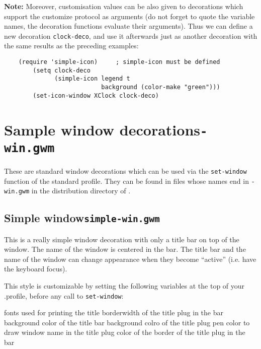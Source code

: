 {\bf Note:} Moreover, customisation values can be also given to decorations
which support the customize protocol as arguments (do not forget to quote the
variable names, the decoration functions evaluate their arguments). Thus we
can define a new decoration \verb"clock-deco", and use it afterwards just as
another decoration with the same results as the preceding examples:

{\exemplefont\begin{verbatim}
	(require 'simple-icon)     ; simple-icon must be defined
        (setq clock-deco 
              (simple-icon legend t 
                           background (color-make "green")))
        (set-icon-window XClock clock-deco)		    
\end{verbatim}}


\section{Sample window decorations\hfill{\tt *-win.gwm}}
\label{standard-decorations}

These are standard window decorations which can be used via the
\verb"set-window" function of the standard profile. They can be found in
files whose names end in {\tt -win.gwm} in the distribution directory of
{\GWM}.

\subsection{Simple window\hfill{\tt simple-win.gwm}}
\label{simple-win}

\centerline{}

This is a really simple window decoration with only a title bar on top of
the window. The name of the window is centered in the bar. The title bar and
the name of the window can change appearance when they become ``active'' (i.e.
have the keyboard focus).

This style is customizable by setting the following variables at the top
of your .profile, before any call to \verb"set-window":

\begin{description}
fonts used for printing the title
borderwidth of the title plug in the bar
background color of the title bar
background colro of the title plug
pen color to draw window name in the title plug
color of the border of the title plug in the bar
\end{description}

